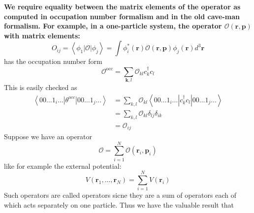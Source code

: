 \textbf{} \textbf{We require equality between the matrix elements of the operator as computed in occupation number formalism and in the old cave-man formalism. For example, in a one-particle system, the operator $\mathcal{O}(\mathbf{r,p})$ with matrix elements:}
\begin{equation}O_{ij}=\left\langle\phi_{1}|\mathcal{O}| \phi_{j}\right\rangle=\int \phi_{i}^{*}(\mathbf{r}) \mathcal{O}(\mathbf{r}, \mathbf{p}) \phi_{j}(\mathbf{r}) d^{3} \mathbf{r}\end{equation}
has the occupation number form
\begin{equation}\mathcal{O}^{\mathrm{occ}}=\sum_{\boldsymbol{k}, l} \mathcal{O}_{k l} c_{k}^{\dagger} c_{l}\end{equation}
This is easily checked as
\begin{equation}\begin{aligned}
\left\langle 00 \ldots 1_{i} \ldots\left|\theta^{occ}\right| 00 \ldots 1_{j} \ldots\right\rangle &=\sum_{k, l} \mathcal{O}_{k l}\left\langle 00 \ldots 1_{i} \ldots\left|c_{k}^{\dagger} c_{l}\right| 00 \ldots 1_{j} \ldots\right\rangle \\
&=\sum_{k, l} \mathcal{O}_{k l} \delta_{lj} \delta_{i k}\\
&=\mathcal{O}_{ij}
\end{aligned}\end{equation}
Suppose we have an operator
\begin{equation}\mathcal{O}=\sum_{i=1}^{N} \mathcal{O}\left(\mathbf{r}_{i}, \mathbf{p}_{i}\right)\end{equation}
like for example the external potential:
\begin{equation}V\left(\mathbf{r}_{1}, \dots, \mathbf{r}_{N}\right)=\sum_{i=1}^{N} V\left(\mathbf{r}_{i}\right)\end{equation}
Such operators are called  operators sicne they are a sum of operators each of which acts separately on one particle. Thus we have the valuable result that \textbf{}

